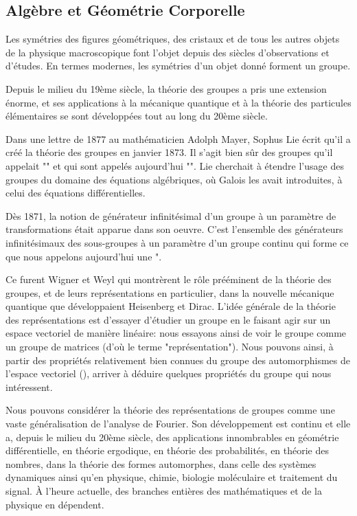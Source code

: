 	\subsection{Algèbre et Géométrie Corporelle}
	Les symétries des figures géométriques, des cristaux et de tous les autres objets de la physique macroscopique font l'objet depuis des siècles d'observations et d'études. En termes modernes, les symétries d'un objet donné forment un groupe. 

	Depuis le milieu du 19ème siècle, la théorie des groupes a pris une extension énorme, et ses applications à la mécanique quantique et à la théorie des particules élémentaires se sont développées tout au long du 20ème siècle.
	
	Dans une lettre de 1877 au mathématicien Adolph Mayer, Sophus Lie écrit qu'il a créé la théorie des groupes en janvier 1873. Il s'agit bien sûr des groupes qu'il appelait "" et qui sont appelés aujourd'hui "\label{lie group}". Lie cherchait à étendre l'usage des groupes du domaine des équations algébriques, où Galois les avait introduites, à celui des équations différentielles.
	
	Dès 1871, la notion de générateur infinitésimal d'un groupe à un paramètre de transformations était apparue dans son oeuvre. C'est l'ensemble des générateurs infinitésimaux des sous-groupes à un paramètre d'un groupe continu qui forme ce que nous appelons aujourd'hui une ".
	
	Ce furent Wigner et Weyl qui montrèrent le rôle prééminent de la théorie des groupes, et de leurs représentations en particulier, dans la nouvelle mécanique quantique que développaient Heisenberg et Dirac. L'idée générale de la théorie des représentations est d'essayer d'étudier un groupe en le faisant agir sur un espace vectoriel de manière linéaire: nous essayons ainsi de voir le groupe comme un groupe de matrices (d'où le terme "représentation"). Nous pouvons ainsi, à partir des propriétés relativement bien connues du groupe des automorphismes de l'espace vectoriel (), arriver à déduire quelques propriétés du groupe qui nous intéressent.
	
	Nous pouvons considérer la théorie des représentations de groupes comme une vaste généralisation de l'analyse de Fourier. Son développement est continu et elle a, depuis le milieu du 20ème siècle, des applications innombrables en géométrie différentielle, en théorie ergodique, en théorie des probabilités, en théorie des nombres, dans la théorie des formes automorphes, dans celle des systèmes dynamiques ainsi qu'en physique, chimie, biologie moléculaire et traitement du signal. À l'heure actuelle, des branches entières des mathématiques et de la physique en dépendent.
	
